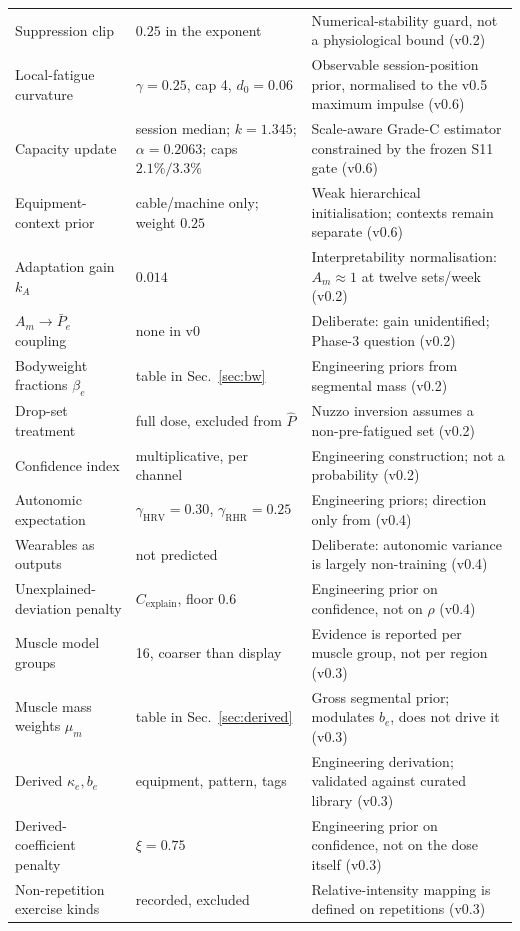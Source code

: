 \documentclass[11pt]{article}
\begin{document}
\begin{longtable}{p{}p{}p{}}
Suppression clip & $0.25$ in the exponent & Numerical-stability guard, not a physiological bound (v0.2) \\
Local-fatigue curvature & $\gamma=0.25$, cap 4, $d_0=0.06$ & Observable session-position prior, normalised to the v0.5 maximum impulse (v0.6) \\
Capacity update & session median; $k=1.345$; $\alpha=0.2063$; caps $2.1\%/3.3\%$ & Scale-aware Grade-C estimator constrained by the frozen S11 gate (v0.6) \\
Equipment-context prior & cable/machine only; weight $0.25$ & Weak hierarchical initialisation; contexts remain separate (v0.6) \\
Adaptation gain $k_A$ & $0.014$ & Interpretability normalisation: $A_m\approx1$ at twelve sets/week (v0.2) \\
$A_m\to\bar P_e$ coupling & none in v0 & Deliberate: gain unidentified; Phase-3 question (v0.2) \\
Bodyweight fractions $\beta_e$ & table in Sec.~\ref{sec:bw} & Engineering priors from segmental mass (v0.2) \\
Drop-set treatment & full dose, excluded from $\widehat P$ & Nuzzo inversion assumes a non-pre-fatigued set (v0.2) \\
Confidence index & multiplicative, per channel & Engineering construction; not a probability (v0.2) \\
Autonomic expectation & $\gamma_{\mathrm{HRV}}=0.30$, $\gamma_{\mathrm{RHR}}=0.25$ & Engineering priors; direction only from \cite{bellenger2016} (v0.4) \\
Wearables as outputs & not predicted & Deliberate: autonomic variance is largely non-training (v0.4) \\
Unexplained-deviation penalty & $C_{\mathrm{explain}}$, floor $0.6$ & Engineering prior on confidence, not on $\rho$ (v0.4) \\
Muscle model groups & 16, coarser than display & Evidence is reported per muscle group, not per region (v0.3) \\
Muscle mass weights $\mu_m$ & table in Sec.~\ref{sec:derived} & Gross segmental prior; modulates $b_e$, does not drive it (v0.3) \\
Derived $\kappa_e,b_e$ & equipment, pattern, tags & Engineering derivation; validated against curated library (v0.3) \\
Derived-coefficient penalty & $\xi=0.75$ & Engineering prior on confidence, not on the dose itself (v0.3) \\
Non-repetition exercise kinds & recorded, excluded & Relative-intensity mapping is defined on repetitions (v0.3) \\
\bottomrule
\end{longtable}
\end{document}
